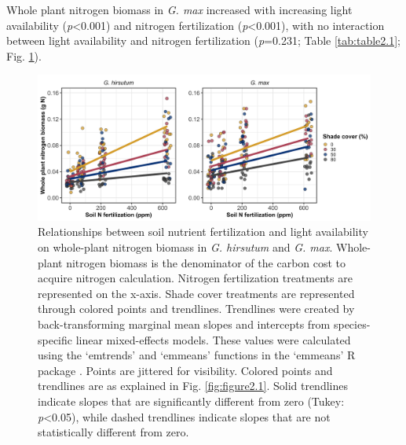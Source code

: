 Whole plant nitrogen biomass in \textit{G. max} increased with increasing light availability (\textit{p}<0.001) and nitrogen fertilization (\textit{p}<0.001), with no interaction between light availability and nitrogen fertilization (\textit{p}=0.231; Table \ref{tab:table2.1}; Fig. \ref{fig:figure2.2}).

\newpage
\begin{landscape}
\begin{figure}
    \includegraphics[scale = 1]{ch2_LxN_Greenhouse/figs/fig2_nacq.png}
    \centering
    \caption[Relationships between soil nitrogen fertilization and light availability on whole-plant nitrogen biomass in \textit{G. hirsutum} and \textit{G. max}]{Relationships between soil nutrient fertilization and light availability on whole-plant nitrogen biomass in \textit{G. hirsutum} and \textit{G. max}. Whole-plant nitrogen biomass is the denominator of the carbon cost to acquire nitrogen calculation. Nitrogen fertilization treatments are represented on the x-axis. Shade cover treatments are represented through colored points and trendlines. Trendlines were created by back-transforming marginal mean slopes and intercepts from species-specific linear mixed-effects models. These values were calculated using the ‘emtrends’ and ‘emmeans’ functions in the ‘emmeans’ R package . Points are jittered for visibility. Colored points and trendlines are as explained in Fig. \ref{fig:figure2.1}. Solid trendlines indicate slopes that are significantly different from zero (Tukey: \textit{p}<0.05), while dashed trendlines indicate slopes that are not statistically different from zero.}
    \label{fig:figure2.2}
    \small
\end{figure}
\end{landscape}
\clearpage

\newpage

